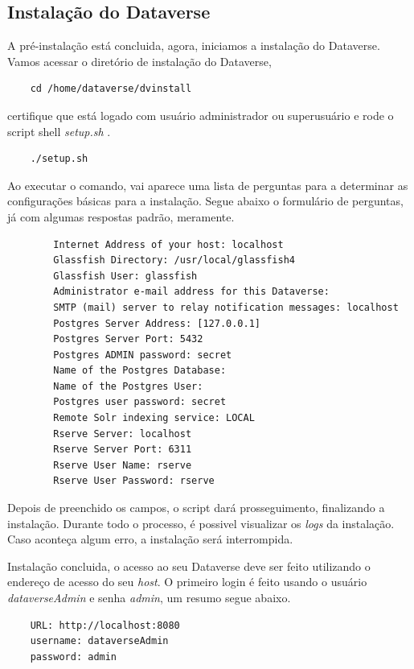 \documentclass[12pt,hidelinks]{article}
\begin{document}
    \subsection{Instalação do Dataverse}
    
        \qquad A pré-instalação está concluida, agora, iniciamos a instalação do Dataverse. Vamos acessar o diretório de instalação do Dataverse,
        \begin{verbatim}
    cd /home/dataverse/dvinstall
        \end{verbatim}
        \newpage
        certifique que está logado com usuário administrador ou superusuário e rode o script shell \textit{setup.sh} .
        
        \begin{verbatim}
    ./setup.sh
        \end{verbatim}
        
        Ao executar o comando, vai aparece uma lista de perguntas para a determinar as configurações básicas para a instalação. Segue abaixo o formulário de perguntas, já com algumas respostas padrão, meramente.
        \begin{verbatim}
        Internet Address of your host: localhost
        Glassfish Directory: /usr/local/glassfish4
        Glassfish User: glassfish
        Administrator e-mail address for this Dataverse: 
        SMTP (mail) server to relay notification messages: localhost
        Postgres Server Address: [127.0.0.1]
        Postgres Server Port: 5432
        Postgres ADMIN password: secret
        Name of the Postgres Database: 
        Name of the Postgres User: 
        Postgres user password: secret
        Remote Solr indexing service: LOCAL
        Rserve Server: localhost
        Rserve Server Port: 6311
        Rserve User Name: rserve
        Rserve User Password: rserve
        \end{verbatim}
        
        Depois de preenchido os campos, o script dará prosseguimento, finalizando a instalação. Durante todo o processo, é possivel visualizar os \textit{logs} da instalação. Caso aconteça algum erro, a instalação será interrompida.
        
        Instalação concluida, o acesso ao seu Dataverse deve ser feito utilizando o endereço de acesso do seu \textit{host}. O primeiro login é feito usando o usuário \textit{dataverseAdmin} e senha \textit{admin}, um resumo segue abaixo.
        \begin{verbatim}
    URL: http://localhost:8080
    username: dataverseAdmin
    password: admin
        \end{verbatim}
    
\end{document}
